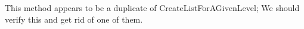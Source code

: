
\begin{DoxyRefList}
\item[\label{bug__bug000001}%
\hypertarget{bug__bug000001}{}%
Member \hyperlink{class_k_k_m_l_l_1_1_feature_vector_list_a6448547dba5f958dde04c5eaf6db1f53}{K\+K\+M\+LL\+:\+:Feature\+Vector\+List\+:\+:Extract\+Examples\+For\+Hierarchy\+Level} (kkuint32 level)]This method appears to be a duplicate of \textquotesingle{}Create\+List\+For\+A\+Given\+Level\textquotesingle{}; We should verify this and get rid of one of them. 
\end{DoxyRefList}